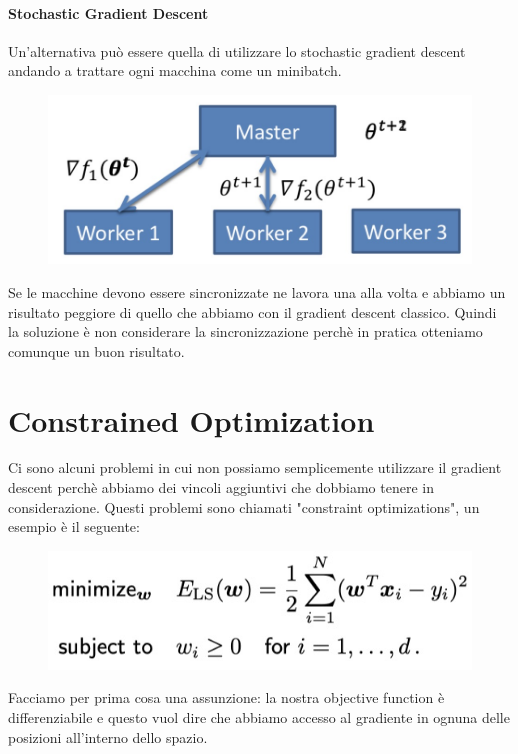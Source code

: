 \documentclass[14pt]{extreport}
\begin{document}
\subsubsection{Stochastic Gradient Descent}

Un'alternativa può essere quella di utilizzare lo stochastic gradient descent andando a trattare ogni macchina come un minibatch.

\begin{figure}[H]
	\centering
	\includegraphics[width=0.7\linewidth]{274.jpeg}
\end{figure}

Se le macchine devono essere sincronizzate ne lavora una alla volta e abbiamo un risultato peggiore di quello che abbiamo con il gradient descent
classico. Quindi la soluzione è non considerare la sincronizzazione perchè in pratica otteniamo comunque un buon risultato.



\chapter{Constrained Optimization}

Ci sono alcuni problemi in cui non possiamo semplicemente utilizzare il gradient descent perchè abbiamo dei vincoli aggiuntivi che dobbiamo tenere in
considerazione. Questi problemi sono chiamati "constraint optimizations", un esempio è il seguente:

\begin{figure}[H]
	\centering
	\includegraphics[width=0.5\linewidth]{275.jpeg}
\end{figure}

Facciamo per prima cosa una assunzione: la nostra objective function è differenziabile e questo vuol dire che abbiamo accesso al gradiente in ognuna
delle posizioni all'interno dello spazio.
\end{document}
